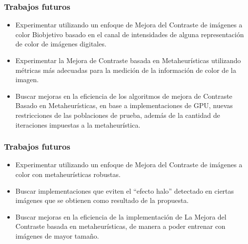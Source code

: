 \documentclass[usenames,dvipsnames]{beamer}
\begin{document}
\begin{frame}
\frametitle{Trabajos futuros} 
\begin{exampleblock}{}
\begin{itemize}
	\item Experimentar utilizando un enfoque de Mejora del Contraste de imágenes a color Biobjetivo basado en el canal de intensidades de alguna representación de color de imágenes digitales.
	\item Experimentar la Mejora de Contraste basada en Metaheurísticas utilizando métricas más adecuadas para la medición de la información de color de la imagen.
	\item Buscar mejoras en la eficiencia de los algoritmos de mejora de Contraste Basado en Metaheurísticas, en base a implementaciones de GPU, nuevas restricciones de las poblaciones de prueba, además de la cantidad de iteraciones impuestas a la metaheurística.
\end{itemize}
\end{exampleblock}
\end{frame}

\begin{frame}
\frametitle{Trabajos futuros} 
\begin{exampleblock}{}
\begin{itemize}
	\item Experimentar utilizando un enfoque de Mejora del Contraste de imágenes a color con metaheurísticas robustas.
	\item Buscar implementaciones que eviten el ``efecto halo'' detectado en ciertas imágenes que se obtienen como resultado de la propuesta.
	\item Buscar mejoras en la eficiencia de la implementación de La Mejora del Contraste basada en metaheurísticas, de manera a poder entrenar con imágenes de mayor tamaño.
\end{itemize}
\end{exampleblock}
\end{frame}




\end{document}
